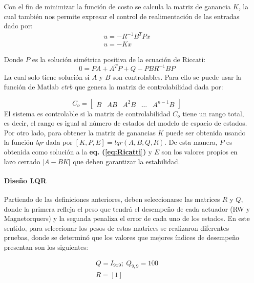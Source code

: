 Con el fin de minimizar la función de costo se calcula la matriz de ganancia $K$, la cual también nos permite expresar el control de realimentación de las entradas dado por:
\begin{gather}\label{eq:K_entradas}
	u = -R^{-1}B^{T}Px\\[10pt]
	u = -Kx
\end{gather}

Donde $P$ es la solución simétrica positiva de la ecuación de Riccati:  
\begin{equation}\label{eq:Ricatti}
 	0 = PA + A^{T}P +Q -PBR^{-1}BP
\end{equation}
La cual solo tiene solución si $A$ y $B$ son controlables. Para ello se puede usar la función de Matlab \textit{ctrb} que genera la matriz de controlabilidad dada por:

\begin{equation}\label{eq:controlabilidad}
	C_o =\left[\begin{array}{lllll}
		B & AB & A^2B &\ldots & A^{n-1}B
	\end{array}\right]
\end{equation}
El sistema es controlable si la matriz de controlabilidad $C_o$ tiene un rango total, es decir, el rango es igual al número de estados del modelo de espacio de estados. Por otro lado, para obtener la matriz de ganancias $K$ puede ser obtenida usando la función \textit{lqr} dada por $[K,P,E] = lqr(A,B,Q,R)$. De esta manera, $P$ es obtenida como solución a la \textbf{eq. (\ref{eq:Ricatti})} y $E$ son los valores propios en lazo cerrado $\lvert A-BK\rvert$ que deben garantizar la estabilidad. 

\paragraph{Diseño LQR}
Partiendo de las definiciones anteriores, deben seleccionarse las matrices $R$ y $Q$, donde la primera refleja el peso que tendrá el desempeño de cada actuador (RW y Magnetorquers) y la segunda penaliza el error de cada uno de los estados. En este sentido, para seleccionar los pesos de estas matrices se realizaron diferentes pruebas, donde se determinó que los valores que mejores índices de desempeño presentan son los siguientes: 

\begin{equation}
	\begin{gathered}
		Q = I_{9x9};
		\;Q_{9,9} = 100\\
		R=[1]
	\end{gathered}	
\end{equation}

